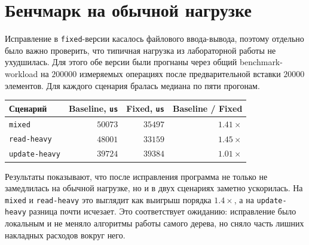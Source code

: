 \section{Бенчмарк на обычной нагрузке}

Исправление в \texttt{fixed}-версии касалось файлового ввода-вывода, поэтому отдельно было важно проверить, что типичная нагрузка из лабораторной работы  не ухудшилась. Для этого обе версии были прогнаны через общий benchmark-workload на \(200000\) измеряемых операциях после предварительной вставки \(20000\) элементов. Для каждого сценария бралась медиана по пяти прогонам.

\begin{center}
\begin{tabular}{|l|r|r|r|}
\hline
Сценарий & Baseline, \texttt{us} & Fixed, \texttt{us} & Baseline / Fixed \\
\hline
\texttt{mixed} & \(50073\) & \(35497\) & \(1.41\times\) \\
\hline
\texttt{read-heavy} & \(48001\) & \(33159\) & \(1.45\times\) \\
\hline
\texttt{update-heavy} & \(39724\) & \(39384\) & \(1.01\times\) \\
\hline
\end{tabular}
\end{center}

Результаты показывают, что после исправления программа не только не замедлилась на обычной нагрузке, но и в двух сценариях заметно ускорилась. На \texttt{mixed} и \texttt{read-heavy} это выглядит как выигрыш порядка \(1.4\times\), а на \texttt{update-heavy} разница почти исчезает. Это соответствует ожиданию: исправление было локальным и не меняло алгоритмы работы самого дерева, но сняло часть лишних накладных расходов вокруг него.
\pagebreak
